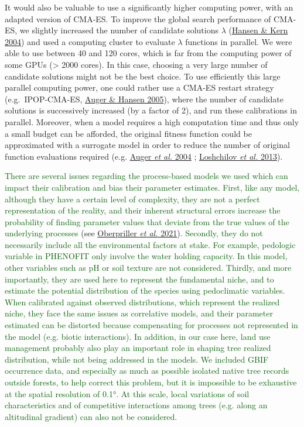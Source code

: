 \documentclass[11pt,]{article}
\begin{document}
It would also be valuable to use a significantly higher computing power,
with an adapted version of CMA-ES. To improve the global search
performance of CMA-ES, we slightly increased the number of candidate
solutions \(\lambda\) (\protect\hyperlink{ref-Hansen2004}{Hansen \& Kern
2004}) and used a computing cluster to evaluate \(\lambda\) functions in
parallel. We were able to use between 40 and 120 cores, which is far
from the computing power of some GPUs (\textgreater{} 2000 cores). In
this case, choosing a very large number of candidate solutions might not
be the best choice. To use efficiently this large parallel computing
power, one could rather use a CMA-ES restart strategy (e.g.~IPOP-CMA-ES,
\protect\hyperlink{ref-Auger2005}{Auger \& Hansen 2005}), where the
number of candidate solutions is successively increased (by a factor of
2), and run these calibrations in parallel. Moreover, when a model
requires a high computation time and thus only a small budget can be
afforded, the original fitness function could be approximated with a
surrogate model in order to reduce the number of original function
evaluations required (e.g. \protect\hyperlink{ref-Auger2004}{Auger
\emph{et al.} 2004} ; \protect\hyperlink{ref-Loshchilov2013}{Loshchilov
\emph{et al.} 2013}).

\textcolor{darkgreen}{There are several issues regarding the process-based models we used which can impact their calibration and bias their parameter estimates. First, like any model, although they have a certain level of complexity, they are not a perfect representation of the reality, and their inherent structural errors increase the probability of finding parameter values that deviate from the true values of the underlying processes }(see
\protect\hyperlink{ref-Oberpriller2021}{Oberpriller \emph{et al.}
2021})\textcolor{darkgreen}{. Secondly, they do not necessarily include all the environmental factors at stake. For example, pedologic variable in PHENOFIT only involve the water holding capacity. In this model, other variables such as pH or soil texture are not considered. Thirdly, and more importantly, they are used here to represent the fundamental niche, and to estimate the potential distribution of the species using pedoclimatic variables. When calibrated against observed distributions, which represent the realized niche, they face the same issues as correlative models, and their parameter estimated can be distorted because compensating for processes not represented in the model (e.g. biotic interactions). In addition, in our case here, land use management probably also play an important role in shaping tree realized distribution, while not being addressed in the models. We included GBIF occurrence data, and especially as much as possible isolated native tree records outside forests, to help correct this problem, but it is impossible to be exhaustive at the spatial resolution of 0.1°. At this scale, local variations of soil characteristics and of competitive interactions among trees (e.g. along an altitudinal gradient) can also not be considered.}
\end{document}
